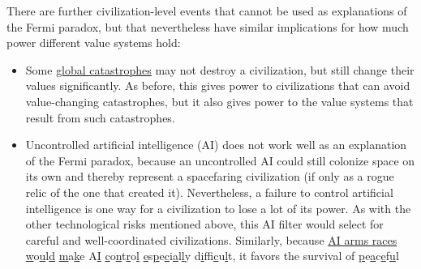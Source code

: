 \documentclass[]{article}
\begin{document}
There are further civilization-level events that cannot be used as
explanations of the Fermi paradox, but that nevertheless have similar
implications for how much power different value systems hold:

\begin{itemize}
\item
  Some
  \href{https://en.wikipedia.org/wiki/Global_catastrophic_risk}{global
  catastrophes} may not destroy a civilization, but still change their
  values significantly. As before, this gives power to civilizations
  that can avoid value-changing catastrophes, but it also gives power to
  the value systems that result from such catastrophes.
\item
  Uncontrolled artificial intelligence (AI) does not work well as an
  explanation of the Fermi paradox, because an uncontrolled AI could
  still colonize space on its own and thereby represent a spacefaring
  civilization (if only as a rogue relic of the one that created it).
  Nevertheless, a failure to control artificial intelligence is one way
  for a civilization to lose a lot of its power. As with the other
  technological risks mentioned above, this AI filter would select for
  careful and well-coordinated civilizations. Similarly, because
  \href{https://wiki.lesswrong.com/wiki/AI_arms_race}{AI arms
  races}
  \href{https://wiki.lesswrong.com/wiki/AI_arms_race}{w}o\href{https://wiki.lesswrong.com/wiki/AI_arms_race}{u}l\href{https://wiki.lesswrong.com/wiki/AI_arms_race}{d}
  \href{https://wiki.lesswrong.com/wiki/AI_arms_race}{m}a\href{https://wiki.lesswrong.com/wiki/AI_arms_race}{k}e
  A\href{https://wiki.lesswrong.com/wiki/AI_arms_race}{I}
  \href{https://wiki.lesswrong.com/wiki/AI_arms_race}{c}o\href{https://wiki.lesswrong.com/wiki/AI_arms_race}{n}t\href{https://wiki.lesswrong.com/wiki/AI_arms_race}{r}o\href{https://wiki.lesswrong.com/wiki/AI_arms_race}{l}
  \href{https://wiki.lesswrong.com/wiki/AI_arms_race}{e}s\href{https://wiki.lesswrong.com/wiki/AI_arms_race}{p}e\href{https://wiki.lesswrong.com/wiki/AI_arms_race}{c}i\href{https://wiki.lesswrong.com/wiki/AI_arms_race}{a}l\href{https://wiki.lesswrong.com/wiki/AI_arms_race}{l}y
  d\href{https://wiki.lesswrong.com/wiki/AI_arms_race}{i}f\href{https://wiki.lesswrong.com/wiki/AI_arms_race}{f}i\href{https://wiki.lesswrong.com/wiki/AI_arms_race}{c}u\href{https://wiki.lesswrong.com/wiki/AI_arms_race}{l}t,
  it favors the survival of
  \href{https://wiki.lesswrong.com/wiki/AI_arms_race}{p}e\href{https://wiki.lesswrong.com/wiki/AI_arms_race}{a}c\href{https://wiki.lesswrong.com/wiki/AI_arms_race}{e}f\href{https://wiki.lesswrong.com/wiki/AI_arms_race}{u}l

\end{itemize}
\end{document}
